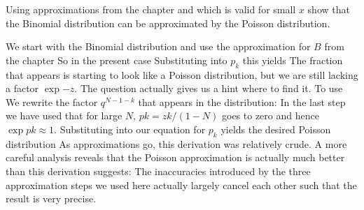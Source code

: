 
Using approximations from the chapter and 
which is valid for small $x$ show that the Binomial distribution can be approximated by the Poisson distribution. 

\solution
We start with the Binomial distribution 
and use the approximation for $B$ from the chapter
So in the present case 
Substituting into $p_k$ this yields 
The fraction that appears is starting to look like a Poisson distribution, but we are still lacking a factor $\exp{-z}$. The question actually gives us a hint where to find it. To use
We rewrite the factor $q^{N-1-k}$ that appears in the distribution: 
In the last step we have used that for large $N$, $pk=zk/(1-N)$ goes to zero and hence $\exp{pk}\approx 1$. Substituting 
into our equation for $p_k$ yields the desired Poisson distribution
As approximations go, this derivation was relatively crude. A more careful analysis reveals that the Poisson approximation is actually much better than this derivation suggests: The inaccuracies introduced by the three approximation steps we used here actually largely cancel each other such that the result is very precise.    
